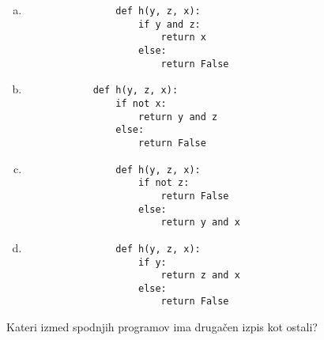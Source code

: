 \documentclass[arhiv, 10pt]{../izpit}
\begin{document}
        \begin{multicols}{2}
        \begin{enumerate}[(a)]
\item 
                \begin{verbatim}
                def h(y, z, x):
                    if y and z:
                        return x
                    else:
                        return False
                \end{verbatim}
            
\item 
            \begin{verbatim}
            def h(y, z, x):
                if not x:
                    return y and z
                else:
                    return False
            \end{verbatim}
        
\item 
                \begin{verbatim}
                def h(y, z, x):
                    if not z:
                        return False
                    else:
                        return y and x
                \end{verbatim}
            
\item 
                \begin{verbatim}
                def h(y, z, x):
                    if y:
                        return z and x
                    else:
                        return False
                \end{verbatim}
            
\end{enumerate}

        \end{multicols}
    
        \naloga*
        
        Kateri izmed spodnjih programov ima drugačen izpis kot ostali?
    
\end{document}
